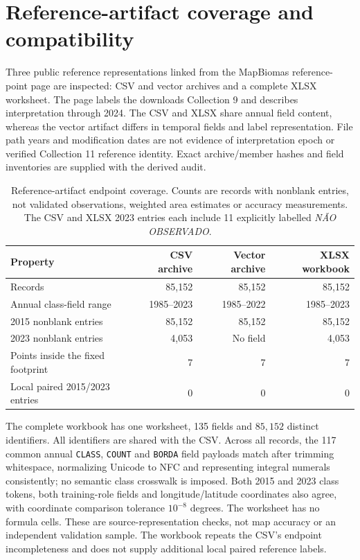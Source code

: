 \documentclass[11pt,a4paper]{article}
\begin{document}
\section{Reference-artifact coverage and compatibility}

Three public reference representations linked from the MapBiomas reference-point page are inspected: CSV and vector archives and a complete XLSX worksheet. The page labels the downloads Collection 9 and describes interpretation through 2024. The CSV and XLSX share annual field content, whereas the vector artifact differs in temporal fields and label representation. File path years and modification dates are not evidence of interpretation epoch or verified Collection 11 reference identity. Exact archive/member hashes and field inventories are supplied with the derived audit.

\begin{table}[htbp]
\centering\small
\caption{Reference-artifact endpoint coverage. Counts are records with nonblank entries, not validated observations, weighted area estimates or accuracy measurements. The CSV and XLSX 2023 entries each include 11 explicitly labelled \emph{N\~AO OBSERVADO}.}\label{tab:reference_coverage}
\begin{tabular}{lrrr}
\toprule
Property & CSV archive & Vector archive & XLSX workbook\\\midrule
Records & 85,152 & 85,152 & 85,152\\
Annual class-field range & 1985--2023 & 1985--2022 & 1985--2023\\
2015 nonblank entries & 85,152 & 85,152 & 85,152\\
2023 nonblank entries & 4,053 & No field & 4,053\\
Points inside the fixed footprint & 7 & 7 & 7\\
Local paired 2015/2023 entries & 0 & 0 & 0\\\bottomrule
\end{tabular}
\end{table}

The complete workbook has one worksheet, 135 fields and $85{,}152$ distinct identifiers. All identifiers are shared with the CSV. Across all records, the 117 common annual \texttt{CLASS}, \texttt{COUNT} and \texttt{BORDA} field payloads match after trimming whitespace, normalizing Unicode to NFC and representing integral numerals consistently; no semantic class crosswalk is imposed. Both 2015 and 2023 class tokens, both training-role fields and longitude/latitude coordinates also agree, with coordinate comparison tolerance $10^{-8}$ degrees. The worksheet has no formula cells. These are source-representation checks, not map accuracy or an independent validation sample. The workbook repeats the CSV's endpoint incompleteness and does not supply additional local paired reference labels.
\end{document}
